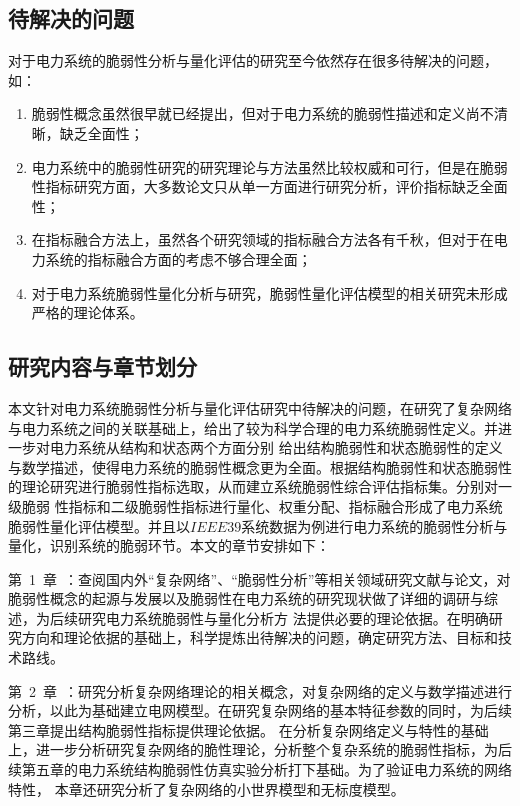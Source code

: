 \subsection{待解决的问题}
\label{sec:research_problem}
对于电力系统的脆弱性分析与量化评估的研究至今依然存在很多待解决的问题，如：
\begin{enumerate}[(1)]
  \item 脆弱性概念虽然很早就已经提出，但对于电力系统的脆弱性描述和定义尚不清晰，缺乏全面性；
  \item 电力系统中的脆弱性研究的研究理论与方法虽然比较权威和可行，但是在脆弱性指标研究方面，大多数论文只从单一方面进行研究分析，评价指标缺乏全面性；
  \item 在指标融合方法上，虽然各个研究领域的指标融合方法各有千秋，但对于在电力系统的指标融合方面的考虑不够合理全面；
  \item 对于电力系统脆弱性量化分析与研究，脆弱性量化评估模型的相关研究未形成严格的理论体系。
 \end{enumerate}

\subsection{研究内容与章节划分}
\label{sec:contendAndIdea}
本文针对电力系统脆弱性分析与量化评估研究中待解决的问题，在研究了复杂网络与电力系统之间的关联基础上，给出了较为科学合理的电力系统脆弱性定义。并进一步对电力系统从结构和状态两个方面分别
给出结构脆弱性和状态脆弱性的定义与数学描述，使得电力系统的脆弱性概念更为全面。根据结构脆弱性和状态脆弱性的理论研究进行脆弱性指标选取，从而建立系统脆弱性综合评估指标集。分别对一级脆弱
性指标和二级脆弱性指标进行量化、权重分配、指标融合形成了电力系统脆弱性量化评估模型。并且以$IEEE39$系统数据为例进行电力系统的脆弱性分析与量化，识别系统的脆弱环节。本文的章节安排如下：

第~1~章~：查阅国内外“复杂网络”、“脆弱性分析”等相关领域研究文献与论文，对脆弱性概念的起源与发展以及脆弱性在电力系统的研究现状做了详细的调研与综述，为后续研究电力系统脆弱性与量化分析方
法提供必要的理论依据。在明确研究方向和理论依据的基础上，科学提炼出待解决的问题，确定研究方法、目标和技术路线。

第~2~章~：研究分析复杂网络理论的相关概念，对复杂网络的定义与数学描述进行分析，以此为基础建立电网模型。在研究复杂网络的基本特征参数的同时，为后续第三章提出结构脆弱性指标提供理论依据。
在分析复杂网络定义与特性的基础上，进一步分析研究复杂网络的脆性理论，分析整个复杂系统的脆弱性指标，为后续第五章的电力系统结构脆弱性仿真实验分析打下基础。为了验证电力系统的网络特性，
本章还研究分析了复杂网络的小世界模型和无标度模型。

